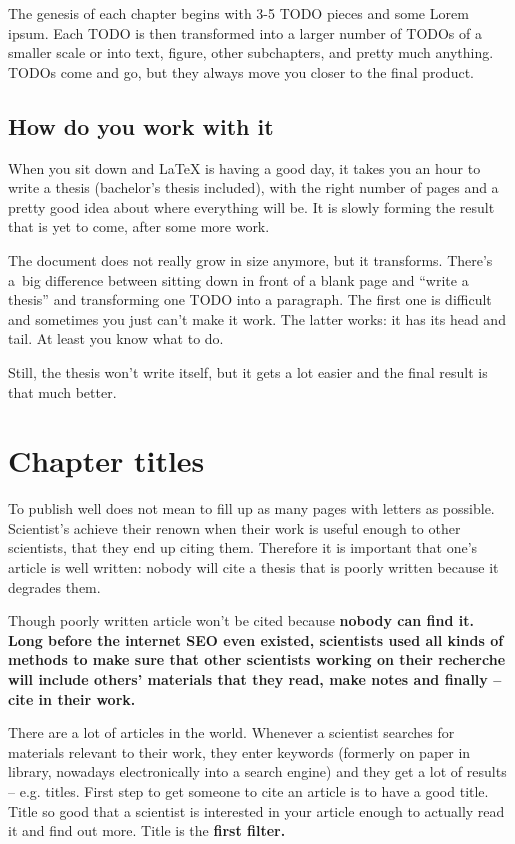The genesis of each chapter begins with 3-5 TODO pieces and some Lorem ipsum. Each TODO is then transformed into a larger number of TODOs of a smaller scale or into text, figure, other subchapters, and pretty much anything. TODOs come and go, but they always move you closer to the final product.

\subsection*{How do you work with it}

When you sit down and LaTeX is having a good day, it takes you an hour to write a thesis (bachelor's thesis included), with the right number of pages and a pretty good idea about where everything will be. It is slowly forming the result that is yet to come, after some more work.

The document does not really grow in size anymore, but it transforms. There's a~big difference between sitting down in front of a blank page and ``write a thesis'' and transforming one TODO into a paragraph. The first one is difficult and sometimes you just can't make it work. The latter works: it has its head and tail. At least you know what to do.

Still, the thesis won't write itself, but it gets a lot easier and the final result is that much better.


\section{Chapter titles}

To publish well does not mean to fill up as many pages with letters as possible. Scientist's achieve their renown when their work is useful enough to other scientists, that they end up citing them. Therefore it is important that one's article is well written: nobody will cite a thesis that is poorly written because it degrades them.

Though poorly written article won't be cited because \bf nobody can find it\rm. Long before the internet SEO even existed, scientists used all kinds of methods to make sure that other scientists working on their recherche will include others' materials that they read, make notes and finally -- cite in their work.

There are a lot of articles in the world. Whenever a scientist searches for materials relevant to their work, they enter keywords (formerly on paper in library, nowadays electronically into a search engine) and they get a lot of results -- e.g. titles. First step to get someone to cite an article is to have a good title. Title so good that a scientist is interested in your article enough to actually read it and find out more. Title is the \bf first filter\rm.


